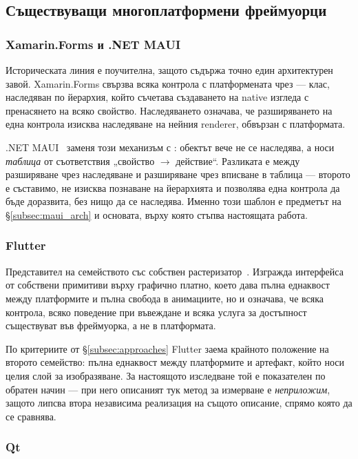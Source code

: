 \subsection{Съществуващи многоплатформени фреймуорци}
\label{subsec:frameworks}

\subsubsection{Xamarin.Forms и .NET MAUI}

Историческата линия е поучителна, защото съдържа точно един архитектурен завой.
Xamarin.Forms свързва всяка контрола с платформената чрез  --- клас,
наследяван по йерархия, който съчетава създаването на native изгледа с пренасянето на
всяко свойство. Наследяването означава, че разширяването на една контрола изисква
наследяване на нейния renderer, обвързан с платформата.

.NET MAUI~\cite{maui_docs,maui_repo} заменя този механизъм с : обектът вече
не се наследява, а носи \emph{таблица} от съответствия „свойство $\rightarrow$ действие“.
Разликата е между разширяване чрез наследяване и разширяване чрез вписване в таблица ---
второто е съставимо, не изисква познаване на йерархията и позволява една контрола да бъде
доразвита, без нищо да се наследява. Именно този шаблон е предметът на §\ref{subsec:maui_arch}
и основата, върху която стъпва настоящата работа.

\subsubsection{Flutter}

Представител на семейството със собствен растеризатор~\cite{flutter_docs}. Изгражда
интерфейса от собствени примитиви върху графично платно, което дава пълна еднаквост между
платформите и пълна свобода в анимациите, но и означава, че всяка контрола, всяко
поведение при въвеждане и всяка услуга за достъпност съществуват във фреймуорка, а не в
платформата.

По критериите от §\ref{subsec:approaches} Flutter заема крайното положение на второто
семейство: пълна еднаквост между платформите и артефакт, който носи целия слой за
изобразяване. За настоящото изследване той е показателен по обратен начин --- при него
описаният тук метод за измерване е \emph{неприложим}, защото липсва втора независима
реализация на същото описание, спрямо която да се сравнява.

\subsubsection{Qt}

